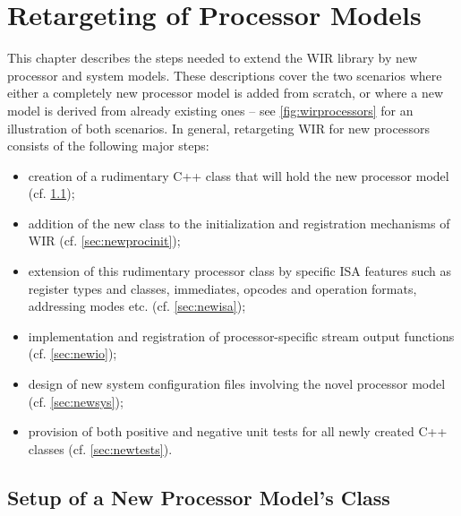 \chapter{Retargeting of Processor Models}
\label{chap:procretarget}
\renewcommand{\sectiontitle}{}

This chapter describes the steps needed to extend the \gls{WIR} library by new processor and system models.
These descriptions cover the two scenarios where either a completely new processor model is added from scratch, or where a new model is derived from already existing ones -- see \cref{fig:wirprocessors} for an illustration of both scenarios.
In general, retargeting \gls{WIR} for new processors consists of the following major steps:
\begin{itemize}
  \item creation of a rudimentary C++ class that will hold the new processor model (cf. \cref{sec:newproc});
  \item addition of the new class to the initialization and registration mechanisms of \gls{WIR} (cf. \cref{sec:newprocinit});
  \item extension of this rudimentary processor class by specific \gls{ISA} features such as register types and classes, immediates, opcodes and operation formats, addressing modes etc. (cf. \cref{sec:newisa});
  \item implementation and registration of processor-specific stream output functions (cf. \cref{sec:newio});
  \item design of new system configuration files involving the novel processor model (cf. \cref{sec:newsys});
  \item provision of both positive and negative unit tests for all newly created C++ classes (cf. \cref{sec:newtests}).
\end{itemize}


\section{Setup of a New Processor Model's Class}
\label{sec:newproc}

